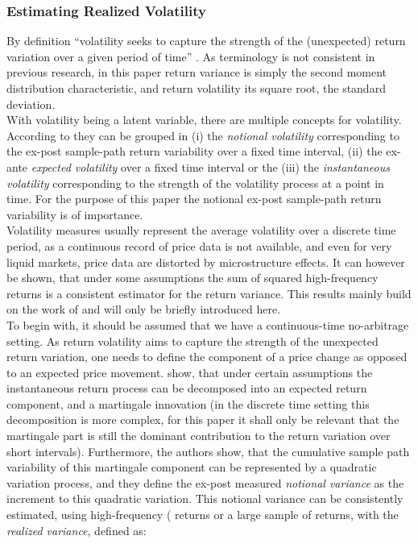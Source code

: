 \subsubsection{Estimating Realized Volatility}\label{sec:221RV}
By definition ``volatility seeks to capture the strength of the (unexpected) return variation over a given period of time'' \parencite[p.7]{andersen2001}. As terminology is not consistent in previous research, in this paper return variance is simply the second moment distribution characteristic, and return volatility its square root, the standard deviation. \\
With volatility being a latent variable, there are multiple concepts for volatility. According to \textcite{andersen2001} they can be grouped in (i) the \emph{notional volatility} corresponding to the ex-post sample-path return variability over a fixed time interval, (ii) the ex-ante \emph{expected volatility} over a fixed time interval or the (iii) the \emph{instantaneous volatility} corresponding to the strength of the volatility process at a point in time. For the purpose of this paper the notional ex-post sample-path return variability is of importance.\\
Volatility measures usually represent the average volatility over a discrete time period, as a continuous record of price data is not available, and even for very liquid markets, price data are distorted by microstructure effects. It can however be shown, that under some assumptions the sum of squared high-frequency returns is a consistent estimator for the return variance. This results mainly build on the work of \textcite{andersen2001} and will only be briefly introduced here.\\
To begin with, it should be assumed that we have a continuous-time no-arbitrage setting. As return volatility aims to capture the strength of the unexpected return variation, one needs to define the component of a price change as opposed to an expected price movement. \textcite{andersen2001} show, that under certain assumptions the instantaneous return process can be decomposed into an expected return component, and a martingale innovation (in the discrete time setting this decomposition is more complex, for this paper it shall only be relevant that the martingale part is still the dominant contribution to the return variation over short intervals). Furthermore, the authors show, that the cumulative sample path variability of this martingale component can be represented by a quadratic variation process, and they define the ex-post measured \emph{notional variance} as the increment to this quadratic variation. This notional variance can be consistently estimated, using high-frequency ( returns or a large sample of returns, with the \emph{realized variance}, defined as:

